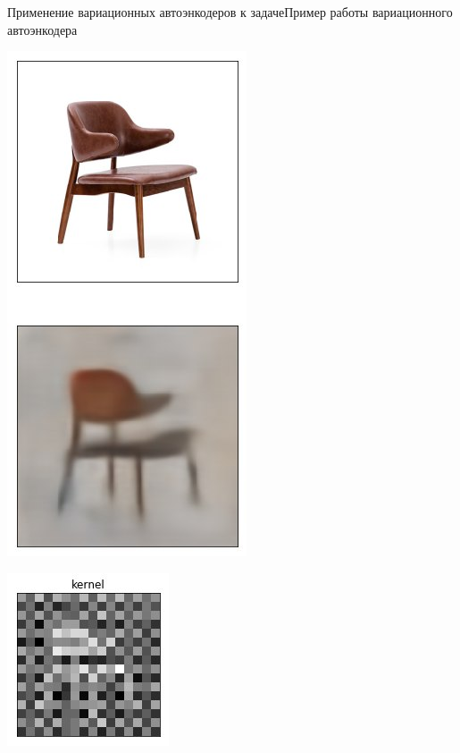 \documentclass{beamer}
\begin{document}
\begin{frame}{Применение вариационных автоэнкодеров к задаче}{Пример работы вариационного автоэнкодера}

\begin{minipage}{0.3\textwidth}
\begin{flushleft}
\includegraphics[scale=0.37]{stul}
\end{flushleft}
\end{minipage}
\hfill
\begin{minipage}{0.5\textwidth}
\begin{flushleft}
\includegraphics[scale=0.7]{stul_kernel}
\end{flushleft}
\end{minipage}

\end{frame}
\end{document}
